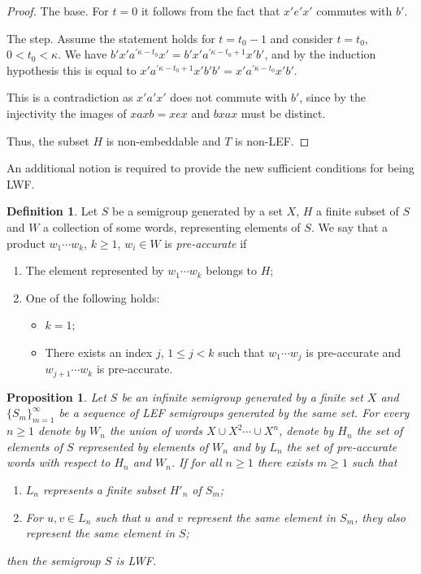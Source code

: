 \documentclass{article}
\newtheorem{proposition}{Proposition}
\theoremstyle{definition}
\newtheorem{definition}{Definition}
\begin{document}
\begin{proof}
The base. For $t=0$ it follows from the fact that $x' e' x'$ commutes with $b'$.

The step. Assume the statement holds for $t = t_0 -1$ and consider $t = t_0$, $0 < t_0 < \kappa$. We have $b' x' a^{\prime \kappa - t_0 } x' = b' x' a^{\prime \kappa - t_0 +1 } x' b'$, and by the induction hypothesis this is equal to $ x' a^{\prime \kappa - t_0 +1 } x'b' b' = x' a^{\prime \kappa - t_0 } x' b'$.

This is a contradiction as $x'a'x'$ does not commute with $b'$, since by the injectivity the images of $xaxb = xex$ and $bxax$ must be distinct.

Thus, the subset $H$ is non-embeddable and $T$ is non-LEF.
\end{proof}

An additional notion is required to provide the new sufficient conditions for being LWF.

\begin{definition}
    Let $S$ be a semigroup generated by a set $X$, $H$ a finite subset of $S$ and $W$ a collection of some words, representing elements of $S$. We say that a product $w_1 \cdots w_k$, $k \ge 1$, $w_i \in W$ is {\em pre-accurate} if

    \begin{enumerate}
\item The element represented by $w_1 \cdots w_k$ belongs to $H$;

\item One of the following holds:

\begin{itemize}
\item[a.] $k=1$;
\item[b.] There exists an index $j$, $1 \le j <k$ such that $w_1 \cdots w_j$ is pre-accurate and $w_{j+1} \cdots w_k$ is pre-accurate.
\end{itemize}
\end{enumerate}
\end{definition}

\begin{proposition}\label{prop_lwfcrit}
    Let $S$ be an infinite semigroup generated by a finite set $X$ and $\{S_m\}_{m=1}^{\infty}$ be a sequence of LEF semigroups generated by the same set. For every $n \ge 1$ denote by $W_n$ the union of words $X \cup X^2 \cdots \cup X^n$, denote by $H_n$ the set of elements of $S$ represented by elements of $W_n$ and by $L_n$  the set of pre-accurate words with respect to $H_n$ and $W_n$. If for all $n \ge 1$ there exists $m \ge 1$ such that 

    \begin{enumerate}
        \item $L_n$ represents a finite subset $H'_n$ of $S_m$;
        \item For $u,v \in L_n$ such that $u$ and $v$ represent the same element in $S_m$, they also represent the same element in $S$;
    \end{enumerate}

    then the semigroup $S$ is LWF.
\end{proposition}
\end{document}
